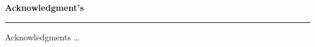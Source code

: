 \newpage
\thispagestyle{empty}


\begin{titlepage}


\begin{flushleft}
{\Large \bf
Acknowledgment's 
}

\vspace{0.01cm}

\rule{\linewidth}{0.05cm}%

\end{flushleft}

{
Acknowledgments \ldots
}

\end{titlepage}

